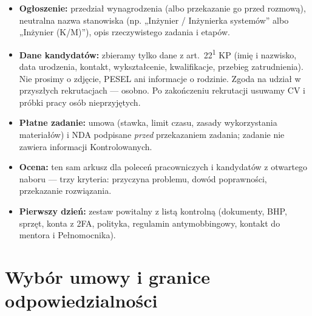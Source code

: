 \documentclass[11pt,a4paper]{report}
\begin{document}
\begin{DlaHR}
\begin{itemize}
  \item \textbf{Ogłoszenie:} przedział wynagrodzenia (albo przekazanie go przed rozmową), neutralna nazwa stanowiska (np. „Inżynier / Inżynierka systemów” albo „Inżynier (K/M)”), opis rzeczywistego zadania i etapów.
  \item \textbf{Dane kandydatów:} zbieramy tylko dane z art.~22\textsuperscript{1} KP (imię i nazwisko, data urodzenia, kontakt, wykształcenie, kwalifikacje, przebieg zatrudnienia). Nie prosimy o zdjęcie, PESEL ani informacje o rodzinie. Zgoda na udział w przyszłych rekrutacjach --- osobno. Po zakończeniu rekrutacji usuwamy CV i próbki pracy osób nieprzyjętych.
  \item \textbf{Płatne zadanie:} umowa (stawka, limit czasu, zasady wykorzystania materiałów) i NDA podpisane \emph{przed} przekazaniem zadania; zadanie nie zawiera informacji Kontrolowanych.
  \item \textbf{Ocena:} ten sam arkusz dla poleceń pracowniczych i kandydatów z otwartego naboru --- trzy kryteria: przyczyna problemu, dowód poprawności, przekazanie rozwiązania.
  \item \textbf{Pierwszy dzień:} zestaw powitalny z listą kontrolną (dokumenty, BHP, sprzęt, konta z 2FA, polityka, regulamin antymobbingowy, kontakt do mentora i Pełnomocnika).
\end{itemize}
\end{DlaHR}


\section{Wybór umowy i granice odpowiedzialności}
\end{document}
